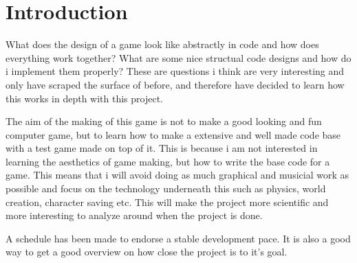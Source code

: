\documentclass[a4paper,12pt]{article}
\begin{document}
\setcounter{tocdepth}{3}
\tableofcontents
 
\clearpage

\section{Introduction}


What does the design of a game look like abstractly in code and how does everything work together?
What are some nice structual code designs and how do i implement them properly?
These are questions i think are very interesting and only have scraped the surface of before, and therefore have decided to learn how this works in depth with this project.

The aim of the making of this game is not to make a good looking and fun computer game, but to learn how to make a extensive and well made code base with a test game made on top of it.
This is because i am not interested in learning the aesthetics of game making, but how to write the base code for a game.
This means that i will avoid doing as much graphical and musicial work as possible and focus on the technology underneath this such as physics, world creation, character saving etc.
This will make the project more scientific and more interesting to analyze around when the project is done.

A schedule has been made to endorse a stable development pace. It is also a good way to get a good overview on how close the project is to it's goal.
\end{document}
